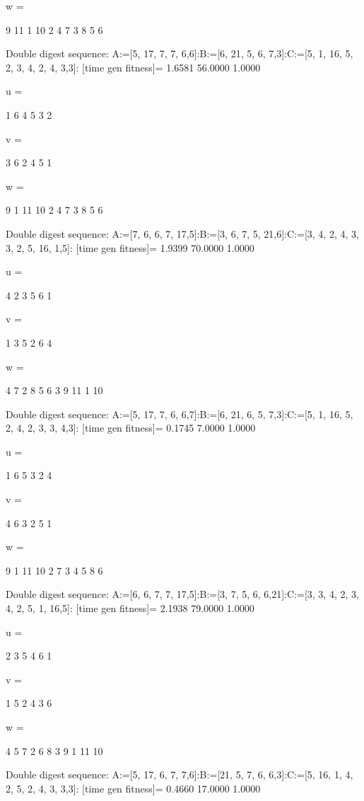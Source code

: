 w =

     9    11     1    10     2     4     7     3     8     5     6

Double digest sequence:
A:=[5, 17, 7, 7, 6,6]:B:=[6, 21, 5, 6, 7,3]:C:=[5, 1, 16, 5, 2, 3, 4, 2, 4, 3,3]:
[time gen fitness]=
    1.6581   56.0000    1.0000


u =

     1     6     4     5     3     2


v =

     3     6     2     4     5     1


w =

     9     1    11    10     2     4     7     3     8     5     6

Double digest sequence:
A:=[7, 6, 6, 7, 17,5]:B:=[3, 6, 7, 5, 21,6]:C:=[3, 4, 2, 4, 3, 3, 2, 5, 16, 1,5]:
[time gen fitness]=
    1.9399   70.0000    1.0000


u =

     4     2     3     5     6     1


v =

     1     3     5     2     6     4


w =

     4     7     2     8     5     6     3     9    11     1    10

Double digest sequence:
A:=[5, 17, 7, 6, 6,7]:B:=[6, 21, 6, 5, 7,3]:C:=[5, 1, 16, 5, 2, 4, 2, 3, 3, 4,3]:
[time gen fitness]=
    0.1745    7.0000    1.0000


u =

     1     6     5     3     2     4


v =

     4     6     3     2     5     1


w =

     9     1    11    10     2     7     3     4     5     8     6

Double digest sequence:
A:=[6, 6, 7, 7, 17,5]:B:=[3, 7, 5, 6, 6,21]:C:=[3, 3, 4, 2, 3, 4, 2, 5, 1, 16,5]:
[time gen fitness]=
    2.1938   79.0000    1.0000


u =

     2     3     5     4     6     1


v =

     1     5     2     4     3     6


w =

     4     5     7     2     6     8     3     9     1    11    10

Double digest sequence:
A:=[5, 17, 6, 7, 7,6]:B:=[21, 5, 7, 6, 6,3]:C:=[5, 16, 1, 4, 2, 5, 2, 4, 3, 3,3]:
[time gen fitness]=
    0.4660   17.0000    1.0000


